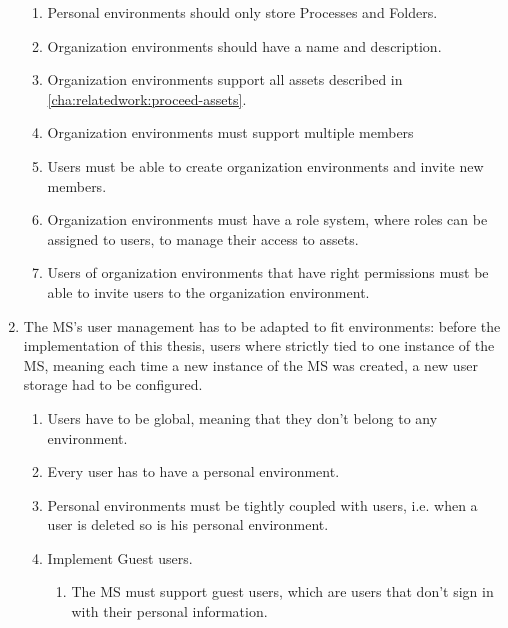 \begin{enumerate}
\begin{enumerate}
		      \item Personal environments should only store Processes and Folders.

		      \item Organization environments should have a name and description.

		      \item Organization environments support all assets described in \ref{cha:relatedwork:proceed-assets}.

		      \item Organization environments must support multiple members

		      \item Users must be able to create organization environments and invite new
		            members.

		      \item Organization environments must have a role system, where roles can be assigned to
		            users, to manage their access to assets.

		      \item Users of organization environments that have right permissions must be able to invite users
		            to the organization environment.
	      \end{enumerate}


	\item The MS's user management has to be adapted to fit environments: before the
	      implementation of this thesis, users where strictly tied to one instance of the MS,
	      meaning each time a new instance of the MS was created, a new user storage had to be
	      configured.
	      \begin{enumerate}
		      \item Users have to be global, meaning that they don't belong to any environment.

		      \item Every user has to have a personal environment.

		      \item Personal environments must be tightly coupled with users, i.e. when a user is
		            deleted so is his personal environment.

		      \item Implement Guest users.
		            \begin{enumerate}
			            \item The MS must support guest users, which are users that don't sign in with their personal
			                  information.


\end{enumerate}
\end{enumerate}
\end{enumerate}
